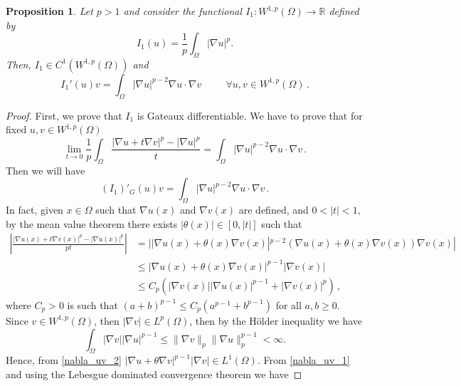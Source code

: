 \documentclass[pdflatex,sn-mathphys-num]{sn-jnl}
\theoremstyle{thmstyleone}%
\newtheorem{proposition}[theorem]{Proposition}%
\theoremstyle{thmstyletwo}%
\theoremstyle{thmstylethree}%
\theoremstyle{thmstylethree}%
\begin{document}
\begin{proposition}\label{prop-nabla}
Let $p>1$ and consider the functional $I_1:W^{1,p}(\Omega)\to \mathbb{R}$ defined by
\begin{equation*}
I_1(u)=\frac{1}{p}\int_{\Omega} |\nabla u|^p.
\end{equation*}
Then, $I_1\in C^1(W^{1,p}(\Omega))$ and 
 \begin{equation*}
I_1'(u)v=\int_{\Omega} |\nabla u|^{p-2} \nabla u\cdot\nabla v \qquad  \ \ \forall  u, v \in W^{1,p}(\Omega) \,.
\end{equation*}
\end{proposition}
\begin{proof}
    First, we prove that $I_1$ is Gateaux differentiable. We have to prove that for fixed $u,v\in W^{1,p}(\Omega)$
\begin{equation*}
   \lim_{t\to 0}\frac{1}{p}\int_{\Omega}\frac{|\nabla u+t\nabla v|^p-|\nabla u|^p}{t} 
   =\int_{\Omega} |\nabla u|^{p-2} \nabla u\cdot\nabla v  \,. 
\end{equation*}
Then we will have 
\begin{equation}\label{I_1_G}
    (I_1)'_G(u)v=\int_{\Omega} |\nabla u|^{p-2} \nabla u\cdot\nabla v   \,.
\end{equation}
In fact, given $x\in \Omega$ such that $\nabla u (x)$ and $\nabla v(x)$ are defined, and $0<|t|<1,$ by the mean value theorem there exists $|\theta(x)|\in [0,|t|]$ such that
\begin{align}\label{nabla_uv_1}
\left|\frac{|\nabla u(x)+t\nabla v(x)|^p-|\nabla u(x)|^p}{pt}\right|&=||\nabla u(x)+\theta(x)\nabla v(x)|^{p-2}(\nabla u(x)+\theta(x)\nabla v(x)) \nabla v(x)| \nonumber\\ &\leqslant |\nabla u(x)+\theta(x)\nabla v(x)|^{p-1}|\nabla v(x)|\nonumber
\\ &\leqslant C_p(|\nabla v(x)||\nabla u(x)|^{p-1}+|\nabla v(x)|^p)\,,
\end{align}
where $C_p>0$ is such that $(a+b)^{p-1}\leqslant C_p(a^{p-1}+b^{p-1})$ for all $a,b\geqslant 0$. 
Since $v\in W^{1,p}(\Omega)$, then $|\nabla v|\in L^p(\Omega)$, then by the Hölder inequality we have
\begin{equation}\label{nabla_uv_2}
\int_{\Omega}|\nabla v||\nabla u|^{p-1} \leqslant \|\nabla v\|_p\|\nabla u\|_p^{p-1}<\infty .
\end{equation}
Hence, from \eqref{nabla_uv_2} $|\nabla u+\theta\nabla v|^{p-1}|\nabla v|\in L^{1}(\Omega).$ From \eqref{nabla_uv_1} and using the Lebesgue dominated convergence theorem we have 



\end{proof}
\end{document}
